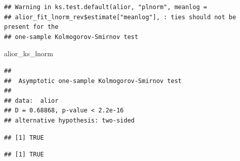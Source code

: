 \documentclass[
]{article}
\newenvironment{Shaded}{\begin{snugshade}}{\end{snugshade}}
\newcommand{\AttributeTok}[1]{\textcolor[rgb]{0.13,0.29,0.53}{#1}}
\newcommand{\FloatTok}[1]{\textcolor[rgb]{0.00,0.00,0.81}{#1}}
\newcommand{\FunctionTok}[1]{\textcolor[rgb]{0.13,0.29,0.53}{\textbf{#1}}}
\newcommand{\NormalTok}[1]{#1}
\newcommand{\OtherTok}[1]{\textcolor[rgb]{0.56,0.35,0.01}{#1}}
\newcommand{\SpecialCharTok}[1]{\textcolor[rgb]{0.81,0.36,0.00}{\textbf{#1}}}
\newcommand{\StringTok}[1]{\textcolor[rgb]{0.31,0.60,0.02}{#1}}
\begin{document}
\begin{verbatim}
## Warning in ks.test.default(alior, "plnorm", meanlog =
## alior_fit_lnorm_rev$estimate["meanlog"], : ties should not be present for the
## one-sample Kolmogorov-Smirnov test
\end{verbatim}

\begin{Shaded}
\begin{Highlighting}[]
\NormalTok{alior\_ks\_lnorm}
\end{Highlighting}
\end{Shaded}

\begin{verbatim}
## 
##  Asymptotic one-sample Kolmogorov-Smirnov test
## 
## data:  alior
## D = 0.68868, p-value < 2.2e-16
## alternative hypothesis: two-sided
\end{verbatim}

\begin{Shaded}
\end{Shaded}

\begin{verbatim}
## [1] TRUE
\end{verbatim}

\begin{Shaded}
\end{Shaded}

\begin{verbatim}
## [1] TRUE
\end{verbatim}

\begin{Shaded}
\end{Shaded}
\end{document}
